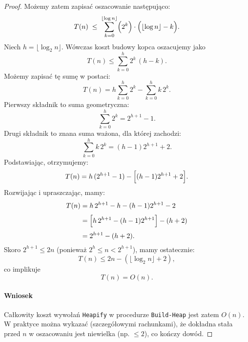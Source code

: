 \documentclass[12pt]{article}
\begin{document}
\begin{proof}
Możemy zatem zapisać oszacowanie następująco:
\[
T(n) \;\le\; \sum_{k=0}^{\lfloor \log n \rfloor} \Bigl( 2^k \Bigr)
\cdot \Bigl(\lfloor \log n \rfloor - k\Bigr).
\]
Niech $h = \lfloor \log_2 n \rfloor$. Wówczas koszt budowy kopca oszacujemy jako
\[
T(n) \le \sum_{k=0}^{h} 2^k\,(h-k).
\]
Możemy zapisać tę sumę w postaci:
\[
T(n) = h \sum_{k=0}^{h} 2^k - \sum_{k=0}^{h} k\,2^k.
\]
Pierwszy składnik to suma geometryczna:
\[
\sum_{k=0}^{h} 2^k = 2^{h+1} - 1.
\]
Drugi składnik to znana suma ważona, dla której zachodzi:
\[
\sum_{k=0}^{h} k\,2^k = (h-1)2^{h+1} + 2.
\]
Podstawiając, otrzymujemy:
\[
T(n) = h\,(2^{h+1} - 1) - \Bigl[(h-1)2^{h+1} + 2\Bigr].
\]
Rozwijając i upraszczając, mamy:
\[
\begin{aligned}
T(n) &= h\,2^{h+1} - h - (h-1)2^{h+1} - 2\\[1mm]
     &= \Bigl[h\,2^{h+1} - (h-1)2^{h+1}\Bigr] - (h+2)\\[1mm]
     &= 2^{h+1} - (h+2).
\end{aligned}
\]
Skoro \(2^{h+1} \le 2n\) (ponieważ \(2^h \le n < 2^{h+1}\)), mamy ostatecznie:
\[
T(n) \le 2n - (\lfloor \log_2 n \rfloor + 2),
\]
co implikuje
\[
T(n) = O(n).
\]

\paragraph{Wniosek}
Całkowity koszt wywołań \texttt{Heapify} w procedurze \texttt{Build-Heap}
jest zatem $O(n)$. W praktyce można wykazać (szczegółowymi rachunkami),
że dokładna stała przed $n$ w oszacowaniu jest niewielka (np. $\le 2$),
co kończy dowód.
\end{proof}
\newpage
\end{document}
